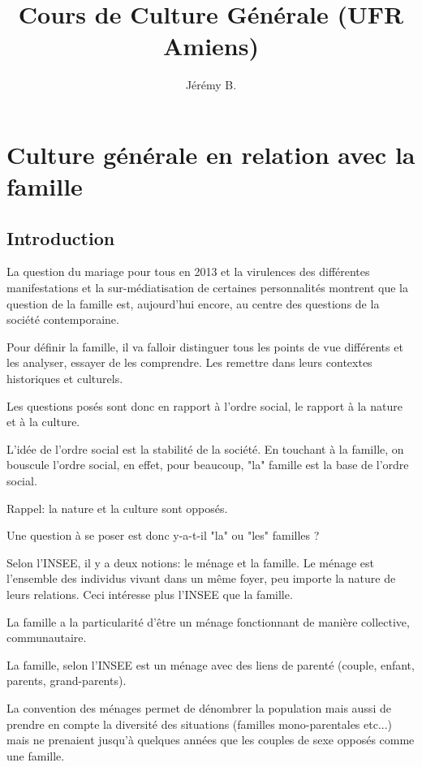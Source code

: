\documentclass[12pt, a4paper, openany]{book}
\author{Jérémy B.}
\date{}
\title{Cours de Culture Générale (UFR Amiens)}
\begin{document}
\maketitle

\part{Culture générale en relation avec la famille}

\chapter{Introduction}

La question du mariage pour tous en 2013 et la virulences des différentes manifestations et la sur-médiatisation de certaines personnalités montrent que la question de la famille est, aujourd'hui encore, au centre des questions de la société contemporaine.

Pour définir la famille, il va falloir distinguer tous les points de vue différents et les analyser, essayer de les comprendre. Les remettre dans leurs contextes historiques et culturels.

Les questions posés sont donc en rapport à l'ordre social, le rapport à la nature et à la culture.

L'idée de l'ordre social est la stabilité de la société. En touchant à la famille, on bouscule l'ordre social, en effet, pour beaucoup, "la" famille est la base de l'ordre social.

Rappel: la nature et la culture sont opposés.

Une question à se poser est donc y-a-t-il "la" ou "les" familles ?

Selon l'INSEE, il y a deux notions: le ménage et la famille. Le ménage est l'ensemble des individus vivant dans un même foyer, peu importe la nature de leurs relations. Ceci intéresse plus l'INSEE que la famille.

La famille a la particularité d'être un ménage fonctionnant de manière collective, communautaire.

La famille, selon l'INSEE est un ménage avec des liens de parenté (couple, enfant, parents, grand-parents).

La convention des ménages permet de dénombrer la population mais aussi de prendre en compte la diversité des situations (familles mono-parentales etc...) mais ne prenaient jusqu'à quelques années que les couples de sexe opposés comme une famille.
\end{document}
